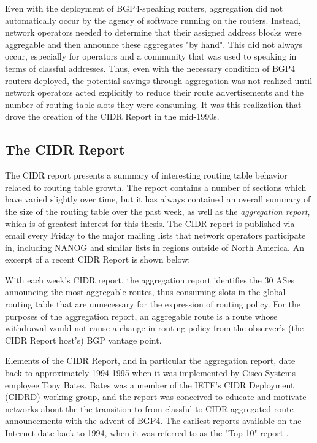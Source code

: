 Even with the deployment of BGP4-speaking routers, aggregation did not automatically occur by the agency of software running on the routers. Instead, network operators needed to determine that their assigned address blocks were aggregable and then announce these aggregates "by hand". This did not always occur, especially for operators and a community that was used to speaking in terms of classful addresses. Thus, even with the necessary condition of BGP4 routers deployed, the potential savings through aggregation was not realized until network operators acted explicitly to reduce their route advertisements and the number of routing table slots they were consuming. It was this realization that drove the creation of the CIDR Report in the mid-1990s.

\subsection{The CIDR Report}

The CIDR report presents a summary of interesting routing table behavior related to routing table growth. The report contains a number of sections which have varied slightly over time, but it has always contained an overall summary of the size of the routing table over the past week, as well as the \emph{aggregation report}, which is of greatest interest for this thesis. The CIDR report is published via email every Friday to the major mailing lists that network operators participate in, including NANOG and similar lists in regions outside of North America. An excerpt of a recent CIDR Report is shown below:


With each week's CIDR report, the aggregation report identifies the 30 ASes announcing the most aggregable routes, thus consuming slots in the global routing table that are unnecessary for the expression of routing policy. For the purposes of the aggregation report, an aggregable route is a route whose withdrawal would not cause a change in routing policy from the observer's (the CIDR Report host's) BGP vantage point.

Elements of the CIDR Report, and in particular the aggregation report, date back to approximately 1994-1995 when it was implemented by Cisco Systems employee Tony Bates. Bates was a member of the IETF's CIDR Deployment (CIDRD) working group, and the report was conceived to educate and motivate networks about the the transition to from classful to CIDR-aggregated route announcements with the advent of BGP4. The earliest reports available on the Internet date back to 1994, when it was referred to as the "Top 10" report \cite{ftp://ftp.ietf.org/ietf-online-proceedings/94jul/area.and.wg.reports/ops/cidrd/cidrd.bates.slides.ps}.

